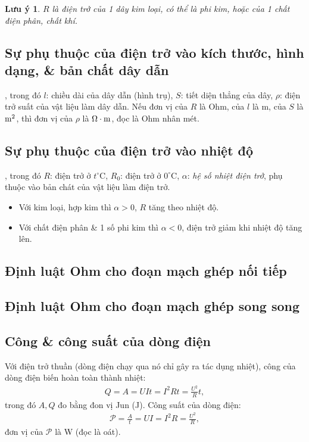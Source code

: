 \documentclass{article}
\newtheorem{luuy}{Lưu ý}
\begin{document}
\begin{luuy}
	$R$ là điện trở của 1 dây kim loại, có thể là phi kim, hoặc của 1 chất điện phân, chất khí.
\end{luuy}

\subsection{Sự phụ thuộc của điện trở vào kích thước, hình dạng, \& bản chất dây dẫn}
, trong đó $l$: chiều dài của dây dẫn (hình trụ), $S$: tiết diện thẳng của dây, $\rho$: điện trở suất của vật liệu làm dây dẫn. Nếu đơn vị của $R$ là Ohm, của $l$ là m, của $S$ là $\rm m^2$, thì đơn vị của $\rho$ là $\rm\Omega\cdot m$, đọc là Ohm nhân mét.

\subsection{Sự phụ thuộc của điện trở vào nhiệt độ}
, trong đó $R$: điện trở ở $t^\circ$C, $R_0$: điện trở ở $0^\circ$C, $\alpha$: \textit{hệ số nhiệt điện trở}, phụ thuộc vào bản chát của vật liệu làm điện trở.
\begin{itemize}
	\item Với kim loại, hợp kim thì $\alpha > 0$, $R$ tăng theo nhiệt độ.
	\item Với chất điện phân \& 1 số phi kim thì $\alpha < 0$, điện trở giảm khi nhiệt độ tăng lên.
\end{itemize}

\subsection{Định luật Ohm cho đoạn mạch ghép nối tiếp}

\subsection{Định luật Ohm cho đoạn mạch ghép song song}

\subsection{Công \& công suất của dòng điện}
Với điện trở thuần (dòng điện chạy qua nó chỉ gây ra tác dụng nhiệt), công của dòng điện biến hoàn toàn thành nhiệt:
\begin{align*}
	\boxed{Q = A = UIt = I^2Rt = \frac{U^2}{R}t,}
\end{align*}
trong đó $A,Q$ đo bằng đon vị Jun (J). Công suất của dòng điện:
\begin{align*}
	\boxed{\mathcal{P} = \frac{A}{t} = UI = I^2R = \frac{U^2}{R},}
\end{align*}
đơn vị của $\mathcal{P}$ là W (đọc là oát).
\end{document}
